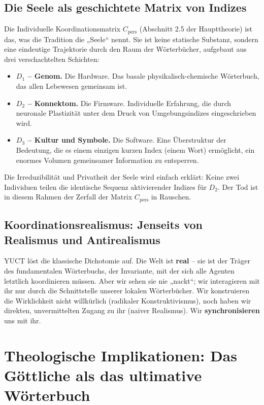 \documentclass[12pt,a4paper]{article}
\begin{document}
	\subsection{Die Seele als geschichtete Matrix von Indizes}
	
	Die Individuelle Koordinationsmatrix \(C_{\mathrm{pers}}\) (Abschnitt 2.5 der Haupttheorie) ist das, was die Tradition die „Seele“ nennt. Sie ist keine statische Substanz, sondern eine eindeutige Trajektorie durch den Raum der Wörterbücher, aufgebaut aus drei verschachtelten Schichten:
	
	\begin{itemize}[leftmargin=*]
		\item \textbf{\(D_1\) – Genom.} Die Hardware. Das basale physikalisch-chemische Wörterbuch, das allen Lebewesen gemeinsam ist.
		\item \textbf{\(D_2\) – Konnektom.} Die Firmware. Individuelle Erfahrung, die durch neuronale Plastizität unter dem Druck von Umgebungsindizes eingeschrieben wird.
		\item \textbf{\(D_3\) – Kultur und Symbole.} Die Software. Eine Überstruktur der Bedeutung, die es einem einzigen kurzen Index (einem Wort) ermöglicht, ein enormes Volumen gemeinsamer Information zu entsperren.
	\end{itemize}
	
	Die Irreduzibilität und Privatheit der Seele wird einfach erklärt: Keine zwei Individuen teilen die identische Sequenz aktivierender Indizes für \(D_2\). Der Tod ist in diesem Rahmen der Zerfall der Matrix \(C_{\mathrm{pers}}\) in Rauschen.
	
	\subsection{Koordinationsrealismus: Jenseits von Realismus und Antirealismus}
	
	YUCT löst die klassische Dichotomie auf. Die Welt ist \textbf{real} – sie ist der Träger des fundamentalen Wörterbuchs, der Invariante, mit der sich alle Agenten letztlich koordinieren müssen. Aber wir sehen sie nie „nackt“; wir interagieren mit ihr nur durch die Schnittstelle unserer lokalen Wörterbücher. Wir konstruieren die Wirklichkeit nicht willkürlich (radikaler Konstruktivismus), noch haben wir direkten, unvermittelten Zugang zu ihr (naiver Realismus). Wir \textbf{synchronisieren} uns mit ihr.
	
	\section{Theologische Implikationen: Das Göttliche als das ultimative Wörterbuch}
	\label{sec:theology}
	
\end{document}
